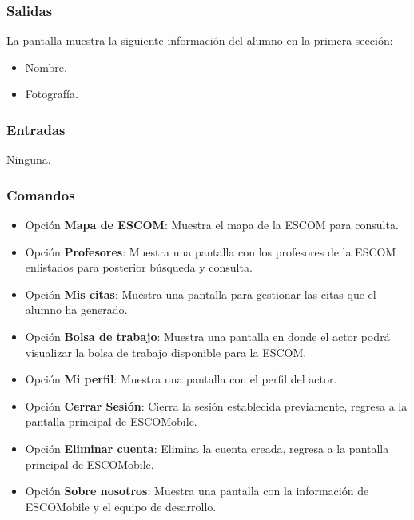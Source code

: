 \subsubsection{Salidas}
	\noindent
	La pantalla muestra la siguiente información del alumno en la primera sección:
	\begin{itemize}
		\item Nombre.
		\item Fotografía. 
	\end{itemize}

\subsubsection{Entradas}
	\noindent
	Ninguna.

\subsubsection{Comandos}
 	\begin{itemize}
		\item Opción \textbf{Mapa de ESCOM}: Muestra el mapa de la ESCOM para consulta.
		\item Opción \textbf{Profesores}: Muestra una pantalla con los profesores de la ESCOM enlistados para posterior búsqueda y consulta.
		\item Opción \textbf{Mis citas}: Muestra una pantalla para gestionar las citas que el alumno ha generado.
		\item Opción \textbf{Bolsa de trabajo}: Muestra una pantalla en donde el actor podrá visualizar la bolsa de trabajo disponible para la ESCOM.
		\item Opción \textbf{Mi perfil}: Muestra una pantalla con el perfil del actor.
		\item Opción \textbf{Cerrar Sesión}: Cierra la sesión establecida previamente, regresa a la pantalla principal de ESCOMobile.
		\item Opción \textbf{Eliminar cuenta}: Elimina la cuenta creada, regresa a la pantalla principal de ESCOMobile.
		\item Opción \textbf{Sobre nosotros}: Muestra una pantalla con la información de ESCOMobile y el equipo de desarrollo.
	\end{itemize}















